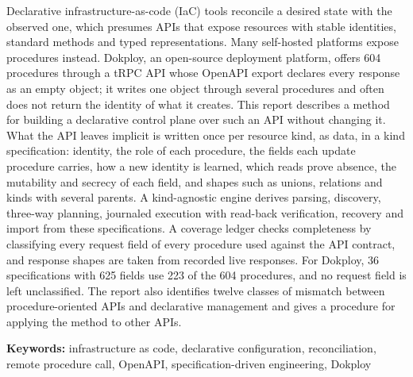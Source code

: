 Declarative infrastructure-as-code (IaC) tools reconcile a desired state with the observed one,
which presumes APIs that expose resources with stable identities, standard methods and typed
representations. Many self-hosted platforms expose procedures instead. Dokploy, an open-source
deployment platform, offers 604 procedures through a tRPC API whose OpenAPI export declares every
response as an empty object; it writes one object through several procedures and often does not
return the identity of what it creates. This report describes a method for building a declarative
control plane over such an API without changing it. What the API leaves implicit is written once per
resource kind, as data, in a kind specification: identity, the role of each procedure, the fields
each update procedure carries, how a new identity is learned, which reads prove absence, the
mutability and secrecy of each field, and shapes such as unions, relations and kinds with several
parents. A kind-agnostic engine derives parsing, discovery, three-way planning, journaled execution
with read-back verification, recovery and import from these specifications. A coverage ledger checks
completeness by classifying every request field of every procedure used against the API contract,
and response shapes are taken from recorded live responses. For Dokploy, 36 specifications with 625
fields use 223 of the 604 procedures, and no request field is left unclassified.  The report also identifies twelve
classes of mismatch between procedure-oriented APIs and declarative management and gives a procedure
for applying the method to other APIs.

\textbf{Keywords:} infrastructure as code, declarative configuration, reconciliation, remote procedure call,
OpenAPI, specification-driven engineering, Dokploy
